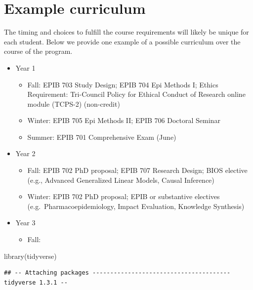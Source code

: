 \documentclass[
]{book}
\newenvironment{Shaded}{\begin{snugshade}}{\end{snugshade}}
\newcommand{\FunctionTok}[1]{\textcolor[rgb]{0.00,0.00,0.00}{#1}}
\newcommand{\NormalTok}[1]{#1}
\providecommand{\tightlist}{%
  \setlength{\itemsep}{0pt}\setlength{\parskip}{0pt}}
\begin{document}
\hypertarget{example-curriculum}{%
\section{Example curriculum}\label{example-curriculum}}

The timing and choices to fulfill the course requirements will likely be unique for each student. Below we provide one example of a possible curriculum over the course of the program.

\begin{itemize}
\tightlist
\item
  Year 1

  \begin{itemize}
  \tightlist
  \item
    Fall: EPIB 703 Study Design; EPIB 704 Epi Methods I; Ethics Requirement: Tri-Council Policy for Ethical Conduct of Research online module (TCPS-2) (non-credit)\\
  \item
    Winter: EPIB 705 Epi Methods II; EPIB 706 Doctoral Seminar
  \item
    Summer: EPIB 701 Comprehensive Exam (June)
  \end{itemize}
\item
  Year 2

  \begin{itemize}
  \tightlist
  \item
    Fall: EPIB 702 PhD proposal; EPIB 707 Research Design; BIOS elective (e.g., Advanced Generalized Linear Models, Causal Inference)
  \item
    Winter: EPIB 702 PhD proposal; EPIB or substantive electives (e.g.~Pharmacoepidemiology, Impact Evaluation, Knowledge Synthesis)
  \end{itemize}
\item
  Year 3

  \begin{itemize}
  \tightlist
  \item
    Fall:
  \end{itemize}
\end{itemize}

\begin{Shaded}
\begin{Highlighting}[]
\FunctionTok{library}\NormalTok{(tidyverse)}
\end{Highlighting}
\end{Shaded}

\begin{verbatim}
## -- Attaching packages --------------------------------------- tidyverse 1.3.1 --
\end{verbatim}
\end{document}
